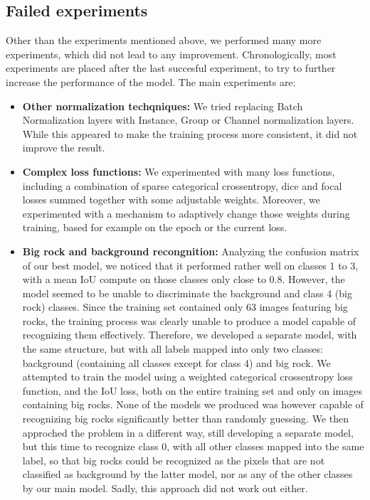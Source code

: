 \documentclass[11pt]{article}
\begin{document}
\begin{multicols}{2}
      \subsection{Failed experiments}
      Other than the experiments mentioned above, we performed many more experiments, which did not lead to any improvement. Chronologically, most experiments are placed after the last succesful experiment, to try to further increase the performance of the model. The main experiments are:
      \begin{itemize}[leftmargin=*]
            \item \textbf{Other normalization techqniques: } We tried replacing Batch Normalization layers with Instance, Group or Channel normalization layers. While this appeared to make the training process more consistent, it did not improve the result.
            \item \textbf{Complex loss functions:} We experimented with many loss functions, including a combination of sparse categorical crossentropy, dice and focal losses summed together with some adjustable weights. Moreover, we experimented with a mechanism to adaptively change those weights during training, based for example on the epoch or the current loss.
            \item \textbf{Big rock and background recongnition:} Analyzing the confusion matrix of our best model, we noticed that it performed rather well on classes 1 to 3, with a mean IoU compute on those classes only close to 0.8. However, the model seemed to be unable to discriminate the background and class 4 (big rock) classes. Since the training set contained only 63 images featuring big rocks, the training process was clearly unable to produce a model capable of recognizing them effectively. Therefore, we developed a separate model, with the same structure, but with all labels mapped into only two classes: background (containing all classes except for class 4) and big rock. We attempted to train the model using a weighted categorical crossentropy loss function, and the IoU loss, both on the entire training set and only on images containing big rocks. None of the models we produced was however capable of recognizing big rocks significantly better than randomly guessing. We then approched the problem in a different way, still developing a separate model, but this time to recognize class 0, with all other classes mapped into the same label, so that big rocks could be recognized as the pixels that are not classified as background by the latter model, nor as any of the other classes by our main model. Sadly, this approach did not work out either.

\end{itemize}
\end{multicols}
\end{document}
